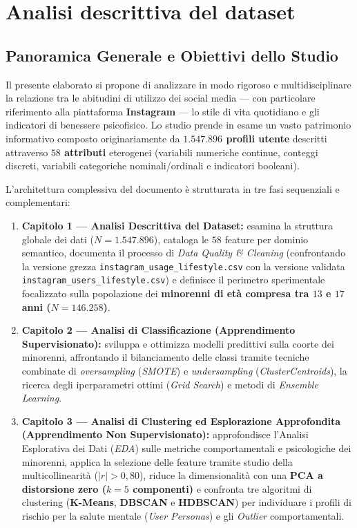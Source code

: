 \chapter{Analisi descrittiva del dataset}
\label{cap:analisi_descrittiva}

\section{Panoramica Generale e Obiettivi dello Studio}
\label{sec:panoramica_dataset}

Il presente elaborato si propone di analizzare in modo rigoroso e multidisciplinare la relazione tra le abitudini di utilizzo dei social media --- con particolare riferimento alla piattaforma \textbf{Instagram} --- lo stile di vita quotidiano e gli indicatori di benessere psicofisico. Lo studio prende in esame un vasto patrimonio informativo composto originariamente da \textbf{$1.547.896$ profili utente} descritti attraverso \textbf{$58$ attributi} eterogenei (variabili numeriche continue, conteggi discreti, variabili categoriche nominali/ordinali e indicatori booleani).

L'architettura complessiva del documento è strutturata in tre fasi sequenziali e complementari:
\begin{enumerate}
    \item \textbf{Capitolo 1 --- Analisi Descrittiva del Dataset:} esamina la struttura globale dei dati ($N = 1.547.896$), cataloga le $58$ feature per dominio semantico, documenta il processo di \emph{Data Quality \& Cleaning} (confrontando la versione grezza \texttt{instagram\_usage\_lifestyle.csv} con la versione validata \texttt{instagram\_users\_lifestyle.csv}) e definisce il perimetro sperimentale focalizzato sulla popolazione dei \textbf{minorenni di età compresa tra $13$ e $17$ anni ($N = 146.258$)}.
    \item \textbf{Capitolo 2 --- Analisi di Classificazione (Apprendimento Supervisionato):} sviluppa e ottimizza modelli predittivi sulla coorte dei minorenni, affrontando il bilanciamento delle classi tramite tecniche combinate di \emph{oversampling} (\emph{SMOTE}) e \emph{undersampling} (\emph{ClusterCentroids}), la ricerca degli iperparametri ottimi (\emph{Grid Search}) e metodi di \emph{Ensemble Learning}.
    \item \textbf{Capitolo 3 --- Analisi di Clustering ed Esplorazione Approfondita (Apprendimento Non Supervisionato):} approfondisce l'Analisi Esplorativa dei Dati (\emph{EDA}) sulle metriche comportamentali e psicologiche dei minorenni, applica la selezione delle feature tramite studio della multicollinearità ($|r| > 0,80$), riduce la dimensionalità con una \textbf{PCA a distorsione zero ($k=5$ componenti)} e confronta tre algoritmi di clustering (\textbf{K-Means}, \textbf{DBSCAN} e \textbf{HDBSCAN}) per individuare i profili di rischio per la salute mentale (\emph{User Personas}) e gli \emph{Outlier} comportamentali.
\end{enumerate}

